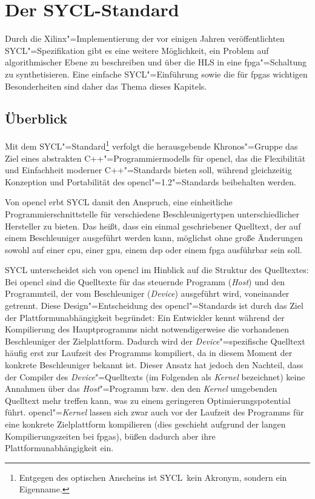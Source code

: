 \chapter{Der SYCL-Standard}\label{sycl}

Durch die Xilinx"=Implementierung der vor einigen Jahren veröffentlichten
SYCL"=Spezifikation gibt es eine weitere Möglichkeit, ein Problem auf
algorithmischer Ebene zu beschreiben und über die HLS in eine
\gls{fpga}"=Schaltung zu synthetisieren. Eine einfache SYCL"=Einführung sowie
die für \gls{fpga}s wichtigen Besonderheiten sind daher das Thema dieses
Kapitels.

\section{Überblick}\label{sycl:ueberblick}

Mit dem SYCL"=Standard\footnote{Entgegen des optischen Anscheins ist
\glqq SYCL\grqq\ kein Akronym, sondern ein Eigenname.}\cite[vgl.][]{sycl2019}
verfolgt die herausgebende Khronos"=Gruppe das Ziel eines abstrakten
C++"=Programmiermodells für \gls{opencl}, das die Flexibilität und Einfachheit
moderner C++"=Standards bieten soll, während gleichzeitig Konzeption und
Portabilität des \gls{opencl}"=1.2"=Standards \cite[vgl.][]{opencl2012}
beibehalten werden.

Von \gls{opencl} erbt SYCL damit den Anspruch, eine einheitliche
Programmierschnittstelle für verschiedene Beschleunigertypen unterschiedlicher
Hersteller zu bieten. Das heißt, dass ein einmal geschriebener Quelltext, der
auf einem Beschleuniger ausgeführt werden kann, möglichst ohne große Änderungen
sowohl auf einer \gls{cpu}, einer \gls{gpu}, einem \gls{dsp} oder einem
\gls{fpga} ausführbar sein soll.

SYCL unterscheidet sich von \gls{opencl} im Hinblick auf die Struktur des
Quelltextes: Bei \gls{opencl} sind die Quelltexte für das steuernde Programm
(\textit{Host}) und den Programmteil, der vom Beschleuniger (\textit{Device})
ausgeführt wird, voneinander getrennt. Diese Design"=Entscheidung des
\gls{opencl}"=Standards ist durch das Ziel der Plattformunabhängigkeit
begründet: Ein Entwickler kennt während der Kompilierung des Hauptprogramms
nicht notwendigerweise die vorhandenen Beschleuniger der Zielplattform. Dadurch
wird der \textit{Device}"=spezifische Quelltext häufig erst zur Laufzeit des
Programms kompiliert, da in diesem Moment der konkrete Beschleuniger bekannt
ist. Dieser Ansatz hat jedoch den Nachteil, dass der Compiler des
\textit{Device}"=Quelltexts (im Folgenden als \textit{Kernel} bezeichnet) keine
Annahmen über das \textit{Host}"=Programm bzw. den den \textit{Kernel}
umgebenden Quelltext mehr treffen kann, was zu einem geringeren
Optimierungspotential führt. \gls{opencl}"=\textit{Kernel} lassen sich zwar auch
vor der Laufzeit des Programms für eine konkrete Zielplattform kompilieren (dies
geschieht aufgrund der langen Kompilierungszeiten bei \gls{fpga}s), büßen
dadurch aber ihre Plattformunabhängigkeit ein.

